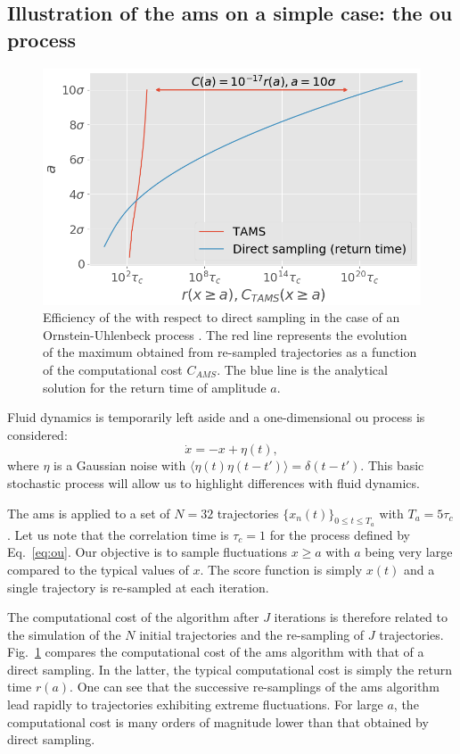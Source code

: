 \documentclass{jfm}
\newcommand{\EL}[1]{{\color{myred}{#1}}}
\begin{document}
\subsection{Illustration of the \ac{ams} on a simple case: the \acl{ou} process}
\label{app:AMS_on_OU}

\begin{figure}
	\centering
	\includegraphics[width=.7\linewidth]{AMS_OU/AMS_OU.png}
	\caption{Efficiency of the \EL{\ac{ams} algorithm} with respect to direct sampling in the case of an Ornstein-Uhlenbeck process \citep{lestang_computing_2018}. The red line represents the evolution of the maximum obtained from re-sampled trajectories as a function of the computational cost $C_{AMS}$. The blue line is the analytical solution for the return time of amplitude $a$.}
	\label{fig:comparaison_temps_de_retour}
\end{figure}
Fluid dynamics is temporarily left aside and a one-dimensional \acl{ou} process is considered:
\begin{equation}
\label{eq:ou}
\dot{x} = -x + \eta (t),
\end{equation}
where $\eta$ is a Gaussian noise with $\langle \eta(t)\eta(t-t')\rangle = \delta(t-t')$.
This basic stochastic process will allow us to highlight differences with fluid dynamics.


The \ac{ams} is applied  to a set of $N=32$ trajectories $\{x_n(t)\}_{0\leq t \leq T_a}$ with $T_a=5\tau_c$.
Let us note that the correlation time is $\tau_c = 1$ for the process defined by Eq.~\eqref{eq:ou}.
Our objective is to sample fluctuations $x\geq a$ with $a$ being very large compared to the typical values of $x$.
The score function is simply $x(t)$ and a single trajectory is re-sampled at each iteration.

The computational cost of the algorithm after $J$ iterations is therefore related to the simulation of the $N$ initial trajectories and the re-sampling of $J$ trajectories.
Fig.~\ref{fig:comparaison_temps_de_retour} compares the computational cost of the \ac{ams} algorithm with that of a direct sampling.
In the latter, the typical computational cost is simply the return time $r(a)$.
One can see that the successive re-samplings of the \ac{ams} algorithm lead rapidly to trajectories exhibiting extreme fluctuations.
For large $a$, the computational cost is many orders of magnitude lower than that obtained by direct sampling.
\end{document}
